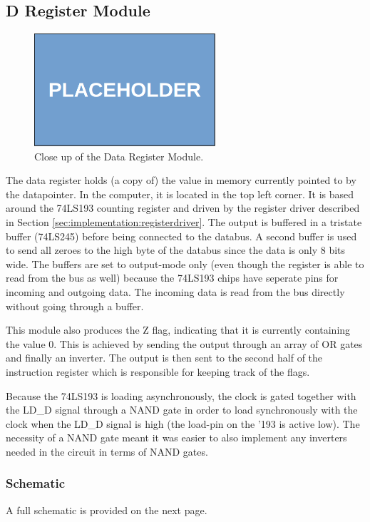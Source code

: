 \subsection{D Register Module}
\begin{figure}[H]
  \centering
  \includegraphics[width=0.6\textwidth]{img/placeholder}
  \caption{Close up of the Data Register Module.}
  \label{fig:dregcloseup}
\end{figure}

The data register holds (a copy of) the value in memory currently pointed to by the datapointer. In the computer, it is located in the top left corner. It is based around the 74LS193 counting register and driven by the register driver described in Section \ref{sec:implementation:registerdriver}. The output is buffered in a tristate buffer (74LS245) before being connected to the databus. A second buffer is used to send all zeroes to the high byte of the databus since the data is only 8 bits wide. The buffers are set to output-mode only (even though the register is able to read from the bus as well) because the 74LS193 chips have seperate pins for incoming and outgoing data. The incoming data is read from the bus directly without going through a buffer.

This module also produces the Z flag, indicating that it is currently containing the value 0. This is achieved by sending the output through an array of OR gates and finally an inverter. The output is then sent to the second half of the instruction register which is responsible for keeping track of the flags.

Because the 74LS193 is loading asynchronously, the clock is gated together with the LD\_D signal through a NAND gate in order to load synchronously with the clock when the LD\_D signal is high (the load-pin on the '193 is active low). The necessity of a NAND gate meant it was easier to also implement any inverters needed in the circuit in terms of NAND gates.


\subsubsection{Schematic}
A full schematic is provided on the next page.


